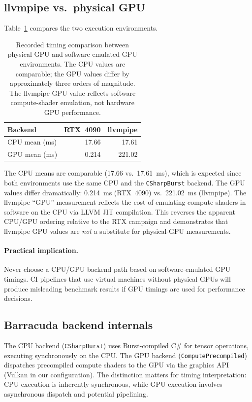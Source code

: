\documentclass[10pt,twocolumn,letterpaper]{article}
\begin{document}
\subsection{llvmpipe vs.\ physical GPU}

Table~\ref{tab:llvmpipe} compares the two execution environments.

\begin{table}[t]
\centering\small
\begin{tabular}{lrr}
\toprule
Backend & RTX~4090 & llvmpipe \\
\midrule
CPU mean (ms) & 17.66 & 17.61 \\
GPU mean (ms) & 0.214 & 221.02 \\
\bottomrule
\end{tabular}
\caption{Recorded timing comparison between physical GPU and software-emulated GPU environments. The CPU values are comparable; the GPU values differ by approximately three orders of magnitude. The llvmpipe GPU value reflects software compute-shader emulation, not hardware GPU performance.}
\label{tab:llvmpipe}
\end{table}

The CPU means are comparable (17.66 vs.\ 17.61~ms), which is expected since both environments use the same CPU and the \texttt{CSharpBurst} backend. The GPU values differ dramatically: 0.214~ms (RTX~4090) vs.\ 221.02~ms (llvmpipe). The llvmpipe ``GPU'' measurement reflects the cost of emulating compute shaders in software on the CPU via LLVM JIT compilation. This reverses the apparent CPU/GPU ordering relative to the RTX campaign and demonstrates that llvmpipe GPU values are \emph{not} a substitute for physical-GPU measurements.

\paragraph{Practical implication.} Never choose a CPU/GPU backend path based on software-emulated GPU timings. CI pipelines that use virtual machines without physical GPUs will produce misleading benchmark results if GPU timings are used for performance decisions.

\subsection{Barracuda backend internals}

The CPU backend (\texttt{CSharpBurst}) uses Burst-compiled C\# for tensor operations, executing synchronously on the CPU. The GPU backend (\texttt{ComputePrecompiled}) dispatches precompiled compute shaders to the GPU via the graphics API (Vulkan in our configuration). The distinction matters for timing interpretation: CPU execution is inherently synchronous, while GPU execution involves asynchronous dispatch and potential pipelining.
\end{document}
